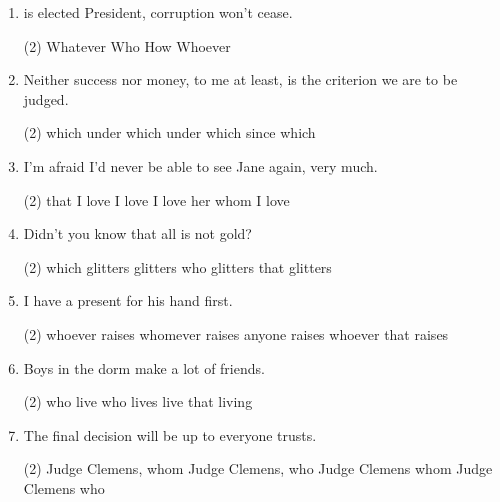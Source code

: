 \begin{enumerate}
I.
\begin{tasks}(2)
  \task that
  \task those
  \task which
  \task what
\end{tasks}

II.
\begin{tasks}(2)
  \task who
  \task what
  \task that
  \task where
\end{tasks}

\item \ttu is elected President, corruption won't cease.
\begin{tasks}(2)
  \task Whatever
  \task Who
  \task How
  \task Whoever
\end{tasks}

\item Neither success nor money, to me at least, is the criterion \ttu we are to be judged.
\begin{tasks}(2)
  \task which
  \task under which
  \task under which
  \task since which
\end{tasks}

\item I'm afraid I'd never be able to see Jane again, \ttu very much.
\begin{tasks}(2)
  \task that I love
  \task I love
  \task I love her
  \task whom I love
\end{tasks}

\item Didn't you know that all \ttu is not gold?
\begin{tasks}(2)
  \task which glitters
  \task glitters
  \task who glitters
  \task that glitters
\end{tasks}

\item I have a present for \ttu his hand first.
\begin{tasks}(2)
  \task whoever raises
  \task whomever raises
  \task anyone raises
  \task whoever that raises
\end{tasks}

\item Boys \ttu in the dorm make a lot of friends.
\begin{tasks}(2)
  \task who live
  \task who lives
  \task live
  \task that living
\end{tasks}

\item The final decision will be up to \ttu everyone trusts.
\begin{tasks}(2)
  \task Judge Clemens, whom
  \task Judge Clemens, who
  \task Judge Clemens whom
  \task Judge Clemens who
\end{tasks}


\end{enumerate}
